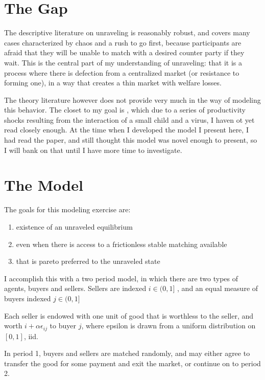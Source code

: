\documentclass[WP]{AEA}
\begin{document}
\section{The Gap}

The descriptive literature on unraveling is reasonably robust, and covers many cases characterized by chaos and a rush to go first, because participants are afraid that they will be unable to match with a desired counter party if they wait. This is the central part of my understanding of unraveling: that it is a process where there is defection from a centralized market (or resistance to forming one), in a way that creates a thin market with welfare losses.  

The theory literature however does not provide very much in the way of modeling this behavior.  The closet to my goal is \cite{Halaburda2010}, which due to a series of productivity shocks resulting from the interaction of a small child and a virus, I haven ot yet read closely enough.  At the time when I developed the model I present here, I had read the paper, and still thought this model was novel enough to present, so I will bank on that until I have more time to investigate.


\section{The Model}
The goals for this modeling exercise are:
\begin{enumerate}
	\item  existence of an unraveled equilibrium
	\item  even when there is access to a frictionless stable matching available
	\item  that is pareto preferred to the unraveled state
\end{enumerate}


I accomplish this with a two period model, in which there are two types of agents, buyers and sellers.
Sellers are indexed $i \in (0,1]$ , and an equal measure of buyers indexed $j \in (0,1]$

Each seller is endowed with one unit of good that is worthless to the seller, and worth $i+\alpha  \epsilon_{ij}$ to buyer $j$, where epsilon is drawn from a uniform distribution on $[0,1]$, iid.

In period 1, buyers and sellers are matched randomly, and may either agree to transfer the good for some payment and exit the market, or continue on to period 2.
\end{document}
